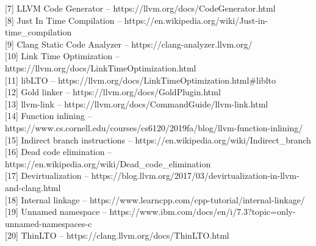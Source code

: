 \documentclass[12pt,oneside]{memoir}
\begin{document}
[7] LLVM Code Generator -- https://llvm.org/docs/CodeGenerator.html \\

[8] Just In Time Compilation  -- https://en.wikipedia.org/wiki/Just-in-time{\_}compilation \\

[9] Clang Static Code Analyzer  -- https://clang-analyzer.llvm.org/ \\ 

[10] Link Time Optimization -- https://llvm.org/docs/LinkTimeOptimization.html \\

[11] libLTO -- https://llvm.org/docs/LinkTimeOptimization.html{\#}liblto \\

[12] Gold linker -- https://llvm.org/docs/GoldPlugin.html \\

[13] llvm-link -- https://llvm.org/docs/CommandGuide/llvm-link.html \\

[14] Function inlining -- https://www.cs.cornell.edu/courses/cs6120/2019fa/blog/llvm-function-inlining/ \\

[15] Indirect branch instructions -- https://en.wikipedia.org/wiki/Indirect{\_}branch \\

[16] Dead code elimination -- https://en.wikipedia.org/wiki/Dead{\_}code{\_}elimination \\

[17] Devirtualization -- https://blog.llvm.org/2017/03/devirtualization-in-llvm-and-clang.html \\

[18] Internal linkage -- https://www.learncpp.com/cpp-tutorial/internal-linkage/ \\

[19] Unnamed namespace -- https://www.ibm.com/docs/en/i/7.3?topic=only-unnamed-namespaces-c \\

[20] ThinLTO -- https://clang.llvm.org/docs/ThinLTO.html
\end{document}
